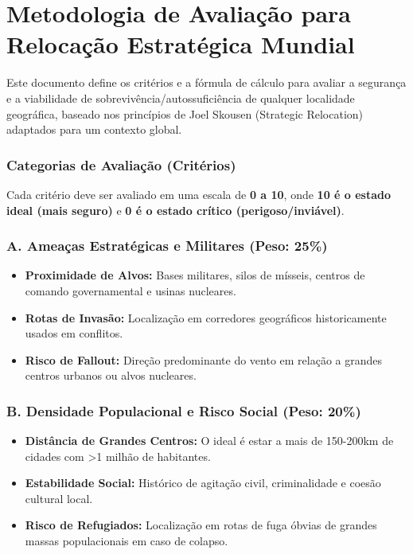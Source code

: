 \section{Metodologia de Avaliação para Relocação Estratégica
Mundial}\label{metodologia-de-avaliauxe7uxe3o-para-relocauxe7uxe3o-estratuxe9gica-mundial}

Este documento define os critérios e a fórmula de cálculo para avaliar a
segurança e a viabilidade de sobrevivência/\allowbreak \allowbreak autossuficiência de qualquer
localidade geográfica, baseado nos princípios de Joel Skousen (Strategic
Relocation) adaptados para um contexto global.

\subsubsection{Categorias de Avaliação
(Critérios)}\label{categorias-de-avaliauxe7uxe3o-crituxe9rios}

Cada critério deve ser avaliado em uma escala de \textbf{0 a 10}, onde
\textbf{10 é o estado ideal (mais seguro)} e \textbf{0 é o estado
crítico (perigoso/\allowbreak \allowbreak inviável)}.

\subsubsection{A. Ameaças Estratégicas e Militares (Peso:
25\%)}\label{a.-ameauxe7as-estratuxe9gicas-e-militares-peso-25}

\begin{itemize}
\tightlist
\item
  \textbf{Proximidade de Alvos:} Bases militares, silos de mísseis,
  centros de comando governamental e usinas nucleares.
\item
  \textbf{Rotas de Invasão:} Localização em corredores geográficos
  historicamente usados em conflitos.
\item
  \textbf{Risco de Fallout:} Direção predominante do vento em relação a
  grandes centros urbanos ou alvos nucleares.
\end{itemize}

\subsubsection{B. Densidade Populacional e Risco Social (Peso:
20\%)}\label{b.-densidade-populacional-e-risco-social-peso-20}

\begin{itemize}
\tightlist
\item
  \textbf{Distância de Grandes Centros:} O ideal é estar a mais de
  150-200km de cidades com \textgreater1 milhão de habitantes.
\item
  \textbf{Estabilidade Social:} Histórico de agitação civil,
  criminalidade e coesão cultural local.
\item
  \textbf{Risco de Refugiados:} Localização em rotas de fuga óbvias de
  grandes massas populacionais em caso de colapso.
\end{itemize}

